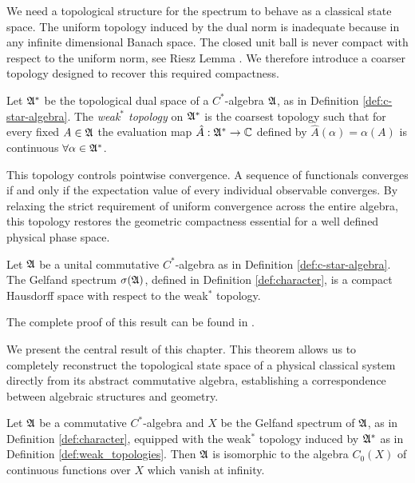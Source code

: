 	We need a topological structure for the spectrum to behave as a classical state space. The uniform topology induced by the dual norm is inadequate because in any infinite dimensional Banach space. The closed unit ball is never compact with respect to the uniform norm, see Riesz Lemma \cite[Theorem II.4]{reedMethodsModernMathematical2003}. We therefore introduce a coarser topology designed to recover this required compactness.
	
	\begin{definition}\label{def:weak_topologies}
		Let $\mathfrak{A}^*$ be the topological dual space of a $C^*$-algebra $\mathfrak{A}$, as in Definition \ref{def:c-star-algebra}. The \emph{weak$^*$ topology} on $\mathfrak{A}^*$ is the coarsest topology such that for every fixed $A \in \mathfrak{A}$ the evaluation map $\hat{A} : \mathfrak{A}^* \to \mathbb{C}$ defined by $\hat{A}(\alpha) = \alpha(A)$ is continuous $\forall \alpha \in \mathfrak{A}^*$.
	\end{definition}
	
	This topology controls pointwise convergence. A sequence of functionals converges if and only if the expectation value of every individual observable converges. By relaxing the strict requirement of uniform convergence across the entire algebra, this topology restores the geometric compactness essential for a well defined physical phase space.
	
	\begin{proposition}\label{prop:spectrum-compactness}
		Let $\mathfrak{A}$ be a unital commutative $C^*$-algebra as in Definition \ref{def:c-star-algebra}. The Gelfand spectrum $\sigma(\mathfrak{A})$, defined in Definition \ref{def:character}, is a compact Hausdorff space with respect to the weak$^*$ topology.
	\end{proposition}
	\noindent The complete proof of this result can be found in \cite[Lemma C.10]{landsmanFoundationsQuantumTheory2017}.
	
	\noindent We present the central result of this chapter. This theorem allows us to completely reconstruct the topological state space of a physical classical system directly from its abstract commutative algebra, establishing a correspondence between algebraic structures and geometry.
	
	\begin{theorem}\label{thm:gelfand}
		Let $\mathfrak{A}$ be a commutative $C^*$-algebra and $X$ be the Gelfand spectrum of $\mathfrak{A}$, as in Definition \ref{def:character}, equipped with the weak$^*$ topology induced by $\mathfrak{A}^*$ as in Definition \ref{def:weak_topologies}. Then $\mathfrak{A}$ is isomorphic to the algebra $C_0(X)$ of continuous functions over $X$ which vanish at infinity. 
	\end{theorem}
	

